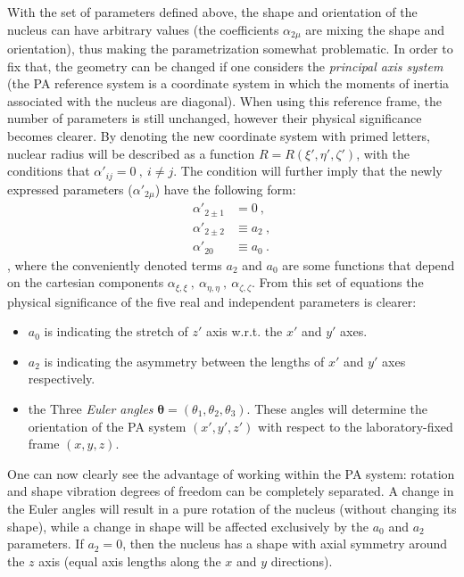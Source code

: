 With the set of parameters defined above, the shape and orientation of the nucleus can have arbitrary values (the coefficients $\alpha_{2\mu}$ are mixing the shape and orientation), thus making the parametrization somewhat problematic. In order to fix that, the geometry can be changed if one considers the \emph{principal axis system} (the PA reference system is a coordinate system in which the moments of inertia associated with the nucleus are diagonal). 
When using this reference frame, the number of parameters is still unchanged, however their physical significance becomes clearer. By denoting the new coordinate system with primed letters, nuclear radius will be described as a function $R=R(\xi',\eta',\zeta')$, with the conditions that $\alpha'_{ij}=0\ ,\ i\neq j$. The condition will further imply that the newly expressed parameters ($\alpha'_{2\mu}$) have the following form:
\begin{align}
    \alpha'_{2 \pm 1}&=0\ , \nonumber \\
    \alpha'_{2 \pm 2}&\equiv a_2\ , \nonumber \\
    \alpha'_{20}&\equiv a_0\ . 
\end{align}
, where the conveniently denoted terms $a_2$ and $a_0$ are some functions that depend on the cartesian components $\alpha_{\xi,\xi}\ ,\ \alpha_{\eta,\eta}\ ,\ \alpha_{\zeta,\zeta}$. From this set of equations the physical significance of the five real and independent parameters is clearer:
\begin{itemize}
    \item $a_0$ is indicating the stretch of $z'$ axis w.r.t. the $x'$ and $y'$ axes.
    \item $a_2$ is indicating the asymmetry between the lengths of $x'$ and $y'$ axes respectively.
    \item the Three \emph{Euler angles} $\mathbf{\theta}=(\theta_1,\theta_2,\theta_3)$. These angles will determine the orientation of the PA system $(x',y',z')$ with respect to the laboratory-fixed frame $(x,y,z)$.
\end{itemize}

One can now clearly see the advantage of working within the PA system: rotation and shape vibration degrees of freedom can be completely separated. A change in the Euler angles will result in a pure rotation of the nucleus (without changing its shape), while a change in shape will be affected exclusively by the $a_0$ and $a_2$ parameters. If $a_2=0$, then the nucleus has a shape with axial symmetry around the $z$ axis (equal axis lengths along the $x$ and $y$ directions).

